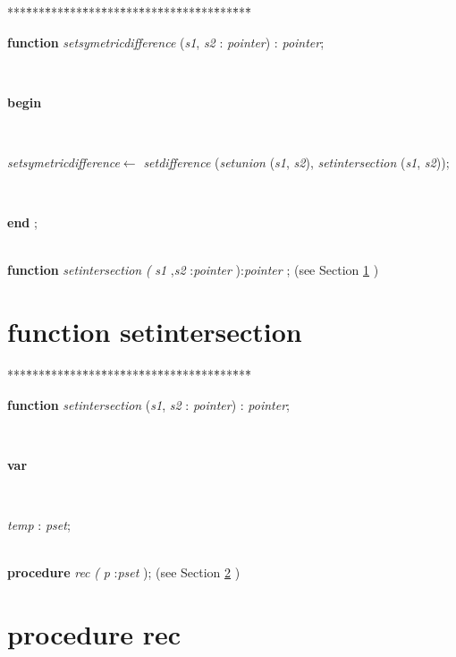 \documentclass[10pt, a4paper]{article}
\begin{document}
\begin{tabbing}
***\=***\=***\=***\=***\=***\=***\=***\=***\=***\=***\=***\=***\=\kill
\parbox{14cm}{\textsf {\textbf {function } \textsf{\textit{setsymetricdifference} (\textit{s1}, \textit{s2} : \textit{pointer}) : \textit{pointer}}; }}\\
\+\parbox{14cm}{\textsf{\textbf{begin} }}\\
\parbox{14cm}{\textsf{\textit{setsymetricdifference}$\leftarrow$ \textit{setdifference} (\textit{setunion} (\textit{s1}, \textit{s2}), \textit{setintersection} (\textit{s1}, \textit{s2}))}; }\\
\<\-\parbox{14cm}{\textsf{\textbf{end} ;}}\\
\+\textsf{\textbf{function}  \textit{setintersection} \textit{(} \textit{s1} ,\textit{s2} :\textit{pointer} ):\textit{pointer} ;} (see Section \ref{sec:genericset/pointer2pset/setle/setge/setequals/setdifference/rec/setsymetricdifferencesetintersection} )\\
\end{tabbing}
\section{function setintersection}\label{sec:genericset/pointer2pset/setle/setge/setequals/setdifference/rec/setsymetricdifferencesetintersection}

\begin{tabbing}
***\=***\=***\=***\=***\=***\=***\=***\=***\=***\=***\=***\=***\=\kill
\parbox{14cm}{\textsf {\textbf {function } \textsf{\textit{setintersection} (\textit{s1}, \textit{s2} : \textit{pointer}) : \textit{pointer}}; }}\\
\+\parbox{14cm}{\textsf{\textbf{var} }}\\
\parbox{14cm}{\textsf{\textit{temp} : \textit{pset}}; }\\
\<\textsf{\textbf{procedure}  \textit{rec} \textit{(} \textit{p} :\textit{pset} );} (see Section \ref{sec:genericset/pointer2pset/setle/setge/setequals/setdifference/rec/setsymetricdifference/setintersectionrec} )\\
\end{tabbing}
\section{procedure rec}\label{sec:genericset/pointer2pset/setle/setge/setequals/setdifference/rec/setsymetricdifference/setintersectionrec}
\end{document}
